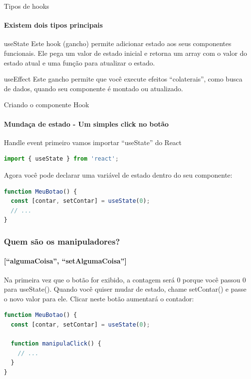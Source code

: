 \documentclass[13pt, xcolor={dvipsnames,svgnames}, portuguese]{beamer}
\begin{document}
\begin{frame}{Tipos de hooks}
\framesubtitle{Existem dois tipos principais}
	\begin{block}{useState }
       Este hook (gancho) permite adicionar estado aos seus componentes funcionais. Ele pega um valor de estado inicial e retorna um array com o valor do estado atual e uma função para atualizar o estado.
	\end{block}	
	\pause
	\begin{block}{useEffect }
       Este gancho permite que você execute efeitos ``colaterais'', como busca de dados, quando seu componente é montado ou atualizado.
	\end{block}		
	
\end{frame}
\begin{frame}[fragile]{Criando o componente Hook}
\framesubtitle{Mundaça de estado -\> Um simples click no botão}
	\begin{block}{Handle event}
       primeiro vamos importar ``useState'' do React
	\end{block}	
	
\begin{lstlisting}[language=JavaScript]
 import { useState } from 'react';
\end{lstlisting}
Agora você pode declarar uma variável de estado dentro do seu componente:

\begin{lstlisting}[language=JavaScript]
function MeuBotao() {
  const [contar, setContar] = useState(0);
  // ...
}
\end{lstlisting}
\end{frame}

\begin{frame}[fragile]
\frametitle{Quem são os manipuladores?}
\framesubtitle{[``algumaCoisa'', ``setAlgumaCoisa'']}

Na primeira vez que o botão for exibido, a contagem será 0 porque você passou 0 para useState(). Quando você quiser mudar de estado, chame setContar() e passe o novo valor para ele. Clicar neste botão aumentará o contador:


\begin{lstlisting}[language=JavaScript]
function MeuBotao() {
  const [contar, setContar] = useState(0);
  
  function manipulaClick() {
    // ...
  }
}
\end{lstlisting}

\end{frame}
\end{document}
